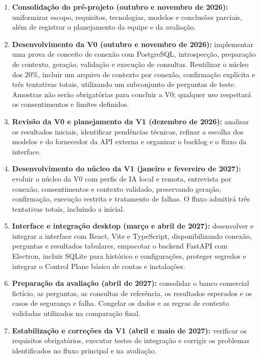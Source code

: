 \begin{enumerate}
    \item \textbf{Consolidação do pré-projeto (outubro e novembro de 2026):} uniformizar escopo, requisitos, tecnologias, modelos e conclusões parciais, além de registrar o planejamento da equipe e da avaliação.

    \item \textbf{Desenvolvimento da V0 (outubro e novembro de 2026):} implementar uma prova de conceito de conexão com PostgreSQL, introspecção, preparação de contexto, geração, validação e execução de consultas. Reutilizar o núcleo dos 20\%, incluir um arquivo de contexto por conexão, confirmação explícita e três tentativas totais, utilizando um subconjunto de perguntas de teste. Amostras não serão obrigatórias para concluir a V0; qualquer uso respeitará os consentimentos e limites definidos.

    \item \textbf{Revisão da V0 e planejamento da V1 (dezembro de 2026):} analisar os resultados iniciais, identificar pendências técnicas, refinar a escolha dos modelos e do fornecedor da API externa e organizar o backlog e o fluxo da interface.

    \item \textbf{Desenvolvimento do núcleo da V1 (janeiro e fevereiro de 2027):} evoluir o núcleo da V0 com perfis de IA local e remota, entrevista por conexão, consentimentos e contexto validado, preservando geração, confirmação, execução restrita e tratamento de falhas. O fluxo admitirá três tentativas totais, incluindo a inicial.

    \item \textbf{Interface e integração desktop (março e abril de 2027):} desenvolver e integrar a interface com React, Vite e TypeScript, disponibilizando conexão, perguntas e resultados tabulares, empacotar o backend FastAPI com Electron, incluir SQLite para histórico e configurações, proteger segredos e integrar o Control Plane básico de contas e instalações.

    \item \textbf{Preparação da avaliação (abril de 2027):} consolidar o banco comercial fictício, as perguntas, as consultas de referência, os resultados esperados e os casos de segurança e falha. Congelar os dados e as regras de contexto validadas utilizados na comparação final.

    \item \textbf{Estabilização e correções da V1 (abril e maio de 2027):} verificar os requisitos obrigatórios, executar testes de integração e corrigir os problemas identificados no fluxo principal e na avaliação.


\end{enumerate}
